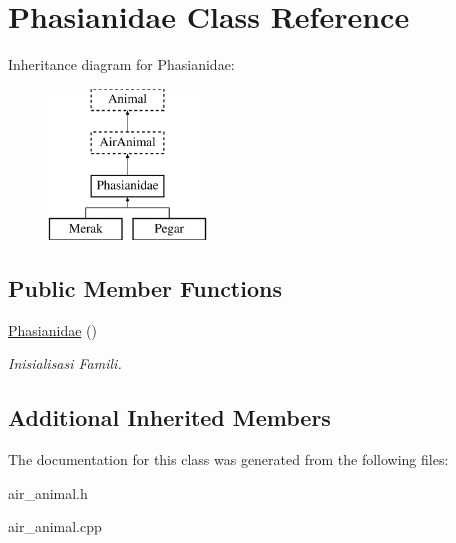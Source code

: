 \hypertarget{class_phasianidae}{}\section{Phasianidae Class Reference}
\label{class_phasianidae}
Inheritance diagram for Phasianidae\+:\begin{figure}[H]
\begin{center}
\leavevmode
\includegraphics[height=4.000000cm]{class_phasianidae}
\end{center}
\end{figure}
\subsection*{Public Member Functions}
\begin{DoxyCompactItemize}
\item 
\hyperlink{class_phasianidae_a035d535d9ce7db815ff97863f9f5682f}{Phasianidae} ()\hypertarget{class_phasianidae_a035d535d9ce7db815ff97863f9f5682f}{}\label{class_phasianidae_a035d535d9ce7db815ff97863f9f5682f}

\begin{DoxyCompactList}\small\item\em Inisialisasi Famili. \end{DoxyCompactList}\end{DoxyCompactItemize}
\subsection*{Additional Inherited Members}


The documentation for this class was generated from the following files\+:\begin{DoxyCompactItemize}
\item 
air\+\_\+animal.\+h\item 
air\+\_\+animal.\+cpp\end{DoxyCompactItemize}

